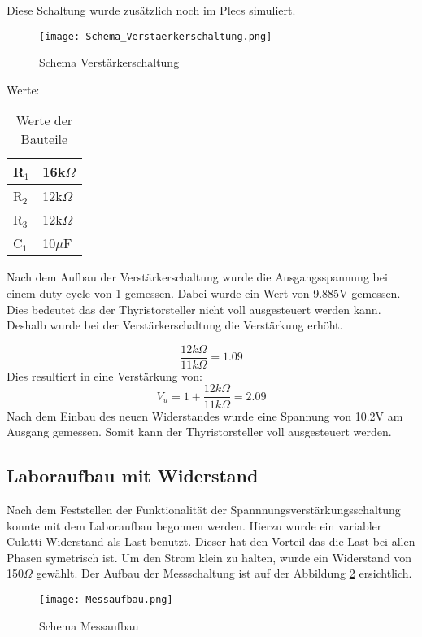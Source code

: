 Diese Schaltung wurde zusätzlich noch im Plecs simuliert.


\newpage
\begin{figure}[ht!]
	\centering
	\texttt{[image: Schema\_Verstaerkerschaltung.png]}	
	\caption{Schema Verstärkerschaltung}\label{fig:Verstaerkerschaltung}
\end{figure}

Werte:
\begin{table}[ht!]
	\centering
	\begin{tabular}{|l|l|}
		\hline
		R$_1$ & 16k$\Omega$ \\ 	\hline
		R$_2$ & 12k$\Omega$ \\ 	\hline
		R$_3$ & 12k$\Omega$ \\	\hline
		C$_1$ & 10$\mu$F 	\\	\hline
	\end{tabular}
	\caption{Werte der Bauteile}
	\label{tab:Verstaerkerschaltung}
\end{table}

Nach dem Aufbau der Verstärkerschaltung wurde die Ausgangsspannung bei einem duty-cycle von 1 gemessen. Dabei wurde ein Wert von 9.885V gemessen. Dies bedeutet das der Thyristorsteller nicht voll ausgesteuert werden kann. Deshalb wurde bei der Verstärkerschaltung die Verstärkung erhöht. 

\begin{equation}
\frac{12k\Omega}{11k\Omega} = 1.09
\end{equation}
Dies resultiert in eine Verstärkung von:
\begin{equation}
V_u = 1 + \frac{12k\Omega}{11k\Omega} = 2.09
\end{equation}
Nach dem Einbau des neuen Widerstandes wurde eine Spannung von 10.2V am Ausgang gemessen. Somit kann der Thyristorsteller voll ausgesteuert werden.

\subsection{Laboraufbau mit Widerstand}
Nach dem Feststellen der Funktionalität der Spannnungsverstärkungsschaltung konnte mit dem Laboraufbau begonnen werden. Hierzu wurde ein variabler Culatti-Widerstand als Last benutzt. Dieser hat den Vorteil das die Last bei allen Phasen symetrisch ist. Um den Strom klein zu halten, wurde ein Widerstand von 150$\Omega$ gewählt. Der Aufbau der Messschaltung ist auf der Abbildung \ref{fig:Messaufbau} ersichtlich. 
\newpage
\begin{figure}[ht!]
	\centering
	\texttt{[image: Messaufbau.png]}	
	\caption{Schema Messaufbau}\label{fig:Messaufbau}
\end{figure}

